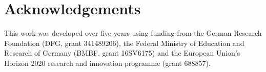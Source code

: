 \documentclass[runningheads]{llncs}
\begin{document}
\section*{Acknowledgements}

This work was developed over five years using funding from the German Research Foundation (DFG, grant 341489206), the Federal Ministry of Education and Research of Germany (BMBF, grant 16SV6175) and the European Union's Horizon 2020 research and innovation programme (grant 688857).



\end{document}

